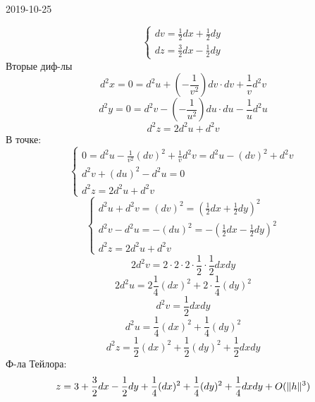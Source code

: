 \documentclass[matan.tex]{subfiles}
\begin{document}
\begin{lect}{2019-10-25}
\begin{Task}[2]
\[\begin{cases}
            dv = \frac{1}{2}dx + \frac{1}{2}dy\\
            dz = \frac{3}{2}dx - \frac{1}{2}dy
        \end{cases}\]
        Вторые диф-лы
        \[d^2 x = 0 = d^2 u + (-\frac{1}{v^2})dv \cdot dv + \frac{1}{v}d^2 v\]
        \[d^2 y = 0 = d^2v - (-\frac{1}{u^{2} })du \cdot du - \frac{1}{u} d^2 u\]
        \[d^2 z = 2d^2u + d^2 v\]
        В точке:
        \[\begin{cases}
            0 = d^2 u - \frac{1}{v^2}(dv)^2 + \frac{1}{v}d^2 v = d^2 u - (dv)^2 + d^2v\\
            d^2 v + (du)^2 - d^2 u = 0\\
            d^2 z = 2d^2 u + d^2 v
        \end{cases}\]
        \[\begin{cases}
            d^2u + d^2v = (dv)^2 = (\frac{1}{2}dx + \frac{1}{2}dy)^2\\
            d^2v - d^2u = -(du)^2 = - (\frac{1}{2}dx - \frac{1}{2}dy)^2\\
            d^2z = 2d^2u + d^2v
        \end{cases}\]
        \[2d^2v = 2 \cdot 2 \cdot 2 \cdot \frac{1}{2} \cdot \frac{1}{2}dxdy\]
        \[2d^2u = 2 \frac{1}{4}(dx)^2 + 2 \cdot \frac{1}{4} (dy)^2\]
        \[d^2v = \frac{1}{2}dxdy\]
        \[d^2u = \frac{1}{4}(dx)^2 + \frac{1}{4}(dy)^2\]
        \[d^2z = \frac{1}{2}(dx)^2 + \frac{1}{2}(dy)^2 + \frac{1}{2}dxdy\]
        Ф-ла Тейлора:
        \[z = 3 + \frac{3}{2}dx - \frac{1}{2}dy  + \frac{1}{4}(dx)^2 + \frac{1}{4}(dy)^2 + 
        \frac{1}{4}dxdy + O(\lVert h \rVert^3)\]
    \end{Task}


\end{lect}
\end{document}

